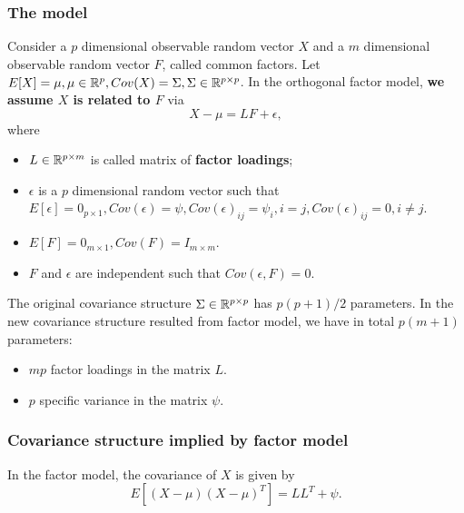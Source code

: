 \begin{refsection}
\subsubsection{The model}
\begin{definition}\cite[482]{johnson2007applied}
Consider a $p$ dimensional observable random vector $X$ and a $m$ dimensional observable random vector $F$, called common factors. Let $E[X] = \mu, \mu\in \mathbb{R}^p, Cov(X) = \Sigma,\Sigma\in\mathbb{R}^{p\times p}$. 
In the orthogonal factor model, \textbf{we assume $X$ is related to $F$} via
$$X - \mu = L F + \epsilon,$$
where 
\begin{itemize}
	\item $L\in \mathbb{R}^{p\times m}$ is called matrix of \textbf{factor loadings};
	\item $\epsilon$ is a $p$ dimensional random vector such that $E[\epsilon] = 0_{p\times 1}, Cov(\epsilon) = \psi, Cov(\epsilon)_{ij} = \psi_{i}, i = j, Cov(\epsilon)_{ij} = 0, i\neq j$.
	\item $E[F] = 0_{m\times 1}, Cov(F) = I_{m\times m}.$
	\item $F$ and $\epsilon$ are independent such that $Cov(\epsilon, F) = 0$.
\end{itemize}
\end{definition}


\begin{remark}
The original covariance structure $\Sigma\in \mathbb{R}^{p\times p}$ has $p(p+1)/2$ parameters. In the new covariance structure resulted from factor model, we have in total $p(m+1)$ parameters:
\begin{itemize}
	\item $mp$ factor loadings in the matrix $L$.
	\item $p$ specific variance in the matrix $\psi$.
\end{itemize} 	
\end{remark}


\subsubsection{Covariance structure implied by factor model}
\begin{lemma}\cite[483]{johnson2007applied}
In the factor model, the covariance of $X$  is given by
$$E[(X-\mu)(X-\mu)^T] = LL^T + \psi.$$	


\end{lemma}
\end{refsection}
